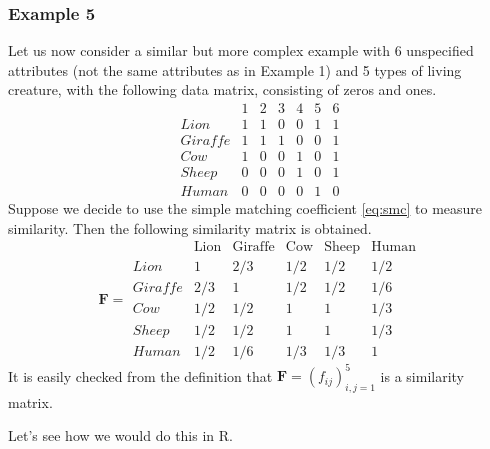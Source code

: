 \documentclass[]{book}
\theoremstyle{definition}
\theoremstyle{definition}
\theoremstyle{definition}
\theoremstyle{remark}
\begin{document}
\hypertarget{example-5}{%
\subsubsection*{Example 5}\label{example-5}}

Let us now consider a similar but more complex example with 6 unspecified attributes (not the same attributes as in Example 1) and 5 types of living creature, with the following data matrix, consisting of zeros and ones.
\[
\begin{array}{lcccccc}
&1&2&3&4&5&6\\
Lion&1&1&0&0&1&1\\
Giraffe&1&1&1&0&0&1\\
Cow&1&0&0&1&0&1\\
Sheep&0&0&0&1&0&1\\
Human&0&0&0&0&1&0
\end{array}
\]
Suppose we decide to use the simple matching coefficient \eqref{eq:smc} to measure similarity. Then the following similarity matrix is obtained.
\[
\mathbf F=\begin{array}{lccccc}
&\text{Lion}&\text{Giraffe}&\text{Cow}&\text{Sheep}&\text{Human}\\
Lion&1&2/3&1/2&1/2&1/2\\
Giraffe&2/3&1&1/2&1/2&1/6\\
Cow&1/2&1/2&1&1&1/3\\
Sheep&1/2&1/2&1&1&1/3\\
Human&1/2&1/6&1/3&1/3&1
\end{array}
\]
It is easily checked from the definition that \({\mathbf F}=(f_{ij})_{i,j=1}^5\) is a similarity matrix.

Let's see how we would do this in R.
\end{document}
